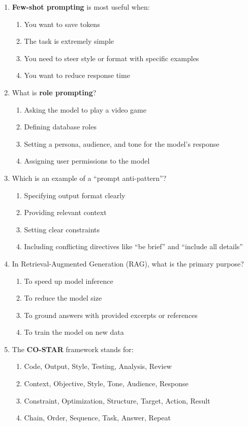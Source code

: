 \documentclass[11pt]{article}
\begin{document}
\begin{enumerate}
\item \textbf{Few-shot prompting} is most useful when:
\begin{enumerate}[label=\Alph*)]
    \item You want to save tokens
    \item The task is extremely simple
    \item You need to steer style or format with specific examples
    \item You want to reduce response time
\end{enumerate}

\item What is \textbf{role prompting}?
\begin{enumerate}[label=\Alph*)]
    \item Asking the model to play a video game
    \item Defining database roles
    \item Setting a persona, audience, and tone for the model's response
    \item Assigning user permissions to the model
\end{enumerate}

\item Which is an example of a ``prompt anti-pattern''?
\begin{enumerate}[label=\Alph*)]
    \item Specifying output format clearly
    \item Providing relevant context
    \item Setting clear constraints
    \item Including conflicting directives like ``be brief'' and ``include all details''
\end{enumerate}

\item In Retrieval-Augmented Generation (RAG), what is the primary purpose?
\begin{enumerate}[label=\Alph*)]
    \item To speed up model inference
    \item To reduce the model size
    \item To ground answers with provided excerpts or references
    \item To train the model on new data
\end{enumerate}

\item The \textbf{CO-STAR} framework stands for:
\begin{enumerate}[label=\Alph*)]
    \item Code, Output, Style, Testing, Analysis, Review
    \item Context, Objective, Style, Tone, Audience, Response
    \item Constraint, Optimization, Structure, Target, Action, Result
    \item Chain, Order, Sequence, Task, Answer, Repeat
\end{enumerate}


\end{enumerate}
\end{document}
